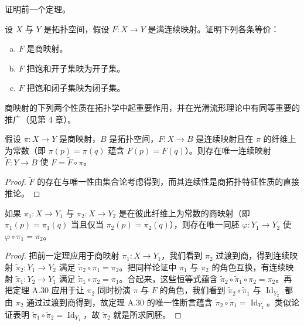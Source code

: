 \documentclass[../../main.tex]{subfiles}
\begin{document}
\begin{exercise}\label{exercise:appA-A-28}
证明前一个定理。
\end{exercise}

\begin{exercise}\label{exercise:appA-A-29}
设 $X$ 与 $Y$ 是拓扑空间，假设 $F:X\to Y$ 是满连续映射。证明下列各条等价：
\begin{enumerate}[(a)]
\item $F$ 是商映射。
\item $F$ 把饱和开子集映为开子集。
\item $F$ 把饱和闭子集映为闭子集。
\end{enumerate}
\end{exercise}

商映射的下列两个性质在拓扑学中起重要作用，并在光滑流形理论中有同等重要的推广（见第 4 章）。

\begin{theorem}[过渡到商]\label{theorem:appA-passing-to-quotient}
假设 $\pi:X\to Y$ 是商映射，$B$ 是拓扑空间，$F:X\to B$ 是连续映射且在 $\pi$ 的纤维上为常数（即 $\pi(p)=\pi(q)$ 蕴含 $F(p)=F(q)$）。则存在唯一连续映射 $\widetilde F:Y\to B$ 使 $F=\widetilde F\circ\pi$。
\end{theorem}

\begin{proof}
$\widetilde F$ 的存在与唯一性由集合论考虑得到，而其连续性是商拓扑特征性质的直接推论。
\end{proof}

\begin{theorem}[商空间的唯一性]\label{theorem:appA-uniqueness-quotient}
如果 $\pi_1:X\to Y_1$ 与 $\pi_2:X\to Y_2$ 是在彼此纤维上为常数的商映射（即 $\pi_1(p)=\pi_1(q)$ 当且仅当 $\pi_2(p)=\pi_2(q)$），则存在唯一同胚 $\varphi:Y_1\to Y_2$ 使 $\varphi\circ\pi_1=\pi_2$。
\end{theorem}

\begin{proof}
把前一定理应用于商映射 $\pi_1:X\to Y_1$，我们看到 $\pi_2$ 过渡到商，得到连续映射 $\widetilde\pi_2:Y_1\to Y_2$ 满足 $\widetilde\pi_2\circ\pi_1=\pi_2$。把同样论证中 $\pi_1$ 与 $\pi_2$ 的角色互换，有连续映射 $\widetilde\pi_1:Y_2\to Y_1$ 满足 $\widetilde\pi_1\circ\pi_2=\pi_1$。合起来，这些恒等式蕴含 $\widetilde\pi_2\circ\widetilde\pi_1\circ\pi_2=\pi_2$。再把定理 A.30 应用于让 $\pi_2$ 同时扮演 $\pi$ 与 $F$ 的角色，我们看到 $\widetilde\pi_2\circ\widetilde\pi_1$ 与 $\operatorname{Id}_{Y_2}$ 都由 $\pi_2$ 通过过渡到商得到，故定理 A.30 的唯一性断言蕴含 $\widetilde\pi_2\circ\widetilde\pi_1=\operatorname{Id}_{Y_2}$。类似论证表明 $\widetilde\pi_1\circ\widetilde\pi_2=\operatorname{Id}_{Y_1}$，故 $\widetilde\pi_2$ 就是所求同胚。
\end{proof}
\end{document}
